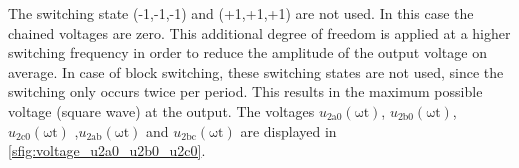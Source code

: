 \begin{solutionblock}
\begin{minipage}{0.55\textwidth}
    \end{minipage}
    \bigskip
    \FloatBarrier
    The switching state (-1,-1,-1) and (+1,+1,+1) are not used. In this case the chained voltages are zero. 
    This additional degree of freedom is applied at a higher switching frequency in order to reduce the amplitude of the
    output voltage on average. In case of block switching, these switching states are not used, since
    the switching only occurs twice per period. This results in the maximum possible voltage (square wave) at the output.
    The voltages $u_\mathrm{2a0}(\mathrm{\omega t})$, $u_\mathrm{2b0}(\mathrm{\omega t})$, $u_\mathrm{2c0}(\mathrm{\omega t})$
    ,$u_\mathrm{2ab}(\mathrm{\omega t})$ and $u_\mathrm{2bc}(\mathrm{\omega t})$ are displayed in \autoref{sfig:voltage_u2a0_u2b0_u2c0}.

    
\end{solutionblock}

